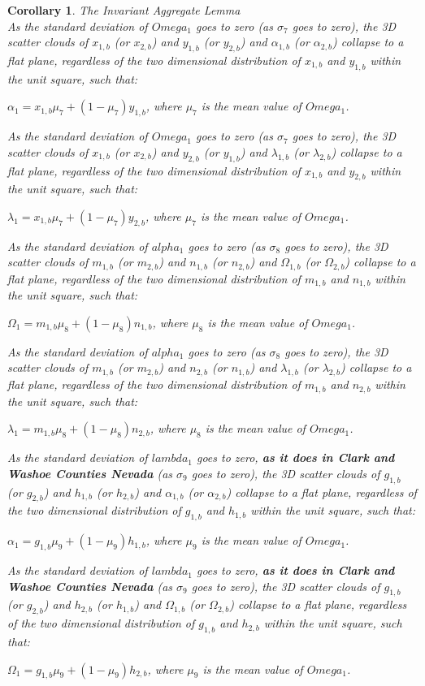 \documentclass[preprint,13pt]{elsarticle}
\newtheorem{corollary}{Corollary}[theorem]
\begin{document}
\newpage
\begin{corollary}{The Invariant Aggregate Lemma}\\
As the standard deviation of $Omega_{1}$ goes to zero (as $\sigma_{7}$ goes to zero), the 3D scatter clouds of $x_{1,b}$ (or $x_{2,b}$) and $y_{1,b}$ (or $y_{2,b}$) and $\alpha_{1,b}$ (or $\alpha_{2,b}$) collapse to a flat plane, regardless of the two dimensional distribution of $x_{1,b}$ and $y_{1,b}$ within the unit square, such that:

$\alpha_{1}=x_{1,b}\mu_{7}+(1-\mu_{7})y_{1,b}$, where $\mu_{7}$ is the mean value of $Omega_{1}$.

As the standard deviation of $Omega_{1}$ goes to zero (as $\sigma_{7}$ goes to zero), the 3D scatter clouds of $x_{1,b}$ (or $x_{2,b}$) and $y_{2,b}$ (or $y_{1,b}$) and $\lambda_{1,b}$ (or $\lambda_{2,b}$) collapse to a flat plane, regardless of the two dimensional distribution of $x_{1,b}$ and $y_{2,b}$ within the unit square, such that:

$\lambda_{1}=x_{1,b}\mu_{7}+(1-\mu_{7})y_{2,b}$, where $\mu_{7}$ is the mean value of $Omega_{1}$.

As the standard deviation of $alpha_{1}$ goes to zero (as $\sigma_{8}$ goes to zero), the 3D scatter clouds of $m_{1,b}$ (or $m_{2,b}$) and $n_{1,b}$ (or $n_{2,b}$) and $\Omega_{1,b}$ (or $\Omega_{2,b}$) collapse to a flat plane, regardless of the two dimensional distribution of $m_{1,b}$ and $n_{1,b}$ within the unit square, such that:

$\Omega_{1}=m_{1,b}\mu_{8}+(1-\mu_{8})n_{1,b}$, where $\mu_{8}$ is the mean value of $Omega_{1}$.

As the standard deviation of $alpha_{1}$ goes to zero (as $\sigma_{8}$ goes to zero), the 3D scatter clouds of $m_{1,b}$ (or $m_{2,b}$) and $n_{2,b}$ (or $n_{1,b}$) and $\lambda_{1,b}$ (or $\lambda_{2,b}$) collapse to a flat plane, regardless of the two dimensional distribution of $m_{1,b}$ and $n_{2,b}$ within the unit square, such that:

$\lambda_{1}=m_{1,b}\mu_{8}+(1-\mu_{8})n_{2,b}$, where $\mu_{8}$ is the mean value of $Omega_{1}$. 

As the standard deviation of $lambda_{1}$ goes to zero, \textbf{as it does in Clark and Washoe Counties Nevada} (as $\sigma_{9}$ goes to zero), the 3D scatter clouds of $g_{1,b}$ (or $g_{2,b}$) and $h_{1,b}$ (or $h_{2,b}$) and $\alpha_{1,b}$ (or $\alpha_{2,b}$) collapse to a flat plane, regardless of the two dimensional distribution of $g_{1,b}$ and $h_{1,b}$ within the unit square, such that:

$\alpha_{1}=g_{1,b}\mu_{9}+(1-\mu_{9})h_{1,b}$, where $\mu_{9}$ is the mean value of $Omega_{1}$.

As the standard deviation of $lambda_{1}$ goes to zero, \textbf{as it does in Clark and Washoe Counties Nevada} (as $\sigma_{9}$ goes to zero), the 3D scatter clouds of $g_{1,b}$ (or $g_{2,b}$) and $h_{2,b}$ (or $h_{1,b}$) and $\Omega_{1,b}$ (or $\Omega_{2,b}$) collapse to a flat plane, regardless of the two dimensional distribution of $g_{1,b}$ and $h_{2,b}$ within the unit square, such that:

$\Omega_{1}=g_{1,b}\mu_{9}+(1-\mu_{9})h_{2,b}$, where $\mu_{9}$ is the mean value of $Omega_{1}$.
\end{corollary}
\end{document}
